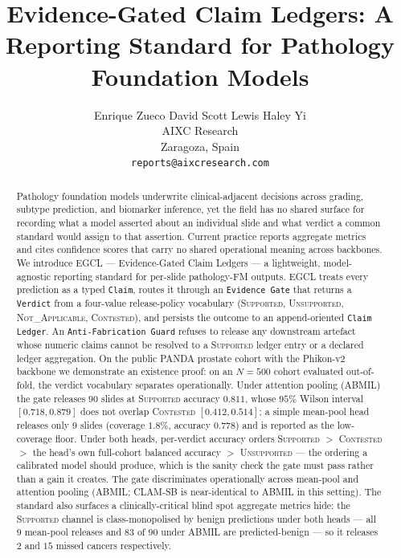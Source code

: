 \documentclass{article}
\title{Evidence-Gated Claim Ledgers: A Reporting Standard for Pathology Foundation Models}
\author{%
  Enrique Zueco \quad David Scott Lewis \quad Haley Yi \\
  AIXC Research \\
  Zaragoza, Spain \\
  \texttt{reports@aixcresearch.com}
}
\newcommand{\SafeNum}[1]{#1}
\newcommand{\AggNum}[2]{#2}
\begin{document}
\maketitle

\begin{abstract}
Pathology foundation models underwrite clinical-adjacent decisions across grading, subtype prediction, and biomarker inference, yet the field has no shared surface for recording what a model asserted about an individual slide and what verdict a common standard would assign to that assertion. Current practice reports aggregate metrics and cites confidence scores that carry no shared operational meaning across backbones. We introduce EGCL --- Evidence-Gated Claim Ledgers --- a lightweight, model-agnostic reporting standard for per-slide pathology-FM outputs. EGCL treats every prediction as a typed \texttt{Claim}, routes it through an \texttt{Evidence Gate} that returns a \texttt{Verdict} from a four-value release-policy vocabulary (\textsc{Supported}, \textsc{Unsupported}, \textsc{Not\_Applicable}, \textsc{Contested}), and persists the outcome to an append-oriented \texttt{Claim Ledger}. An \texttt{Anti-Fabrication Guard} refuses to release any downstream artefact whose numeric claims cannot be resolved to a \textsc{Supported} ledger entry or a declared ledger aggregation. On the public PANDA prostate cohort with the Phikon-v2 backbone we demonstrate an existence proof: on an $N{=}\SafeNum{500}$ cohort evaluated out-of-fold, the verdict vocabulary separates operationally. Under attention pooling (ABMIL) the gate releases $\AggNum{abmil.supported.n}{90}$ slides at \textsc{Supported} accuracy $\AggNum{abmil.supported.acc}{0.811}$, whose $\SafeNum{95\%}$ Wilson interval $[\AggNum{abmil.supported.wilson.lo}{0.718}, \AggNum{abmil.supported.wilson.hi}{0.879}]$ does not overlap \textsc{Contested} $[\AggNum{abmil.contested.wilson.lo}{0.412}, \AggNum{abmil.contested.wilson.hi}{0.514}]$; a simple mean-pool head releases only $\AggNum{meanpool.supported.n}{9}$ slides (coverage $\AggNum{meanpool.coverage_pct}{1.8}\%$, accuracy $\AggNum{meanpool.supported.acc}{0.778}$) and is reported as the low-coverage floor. Under both heads, per-verdict accuracy orders \textsc{Supported} $>$ \textsc{Contested} $>$ the head's own full-cohort balanced accuracy $>$ \textsc{Unsupported} --- the ordering a calibrated model should produce, which is the sanity check the gate must pass rather than a gain it creates. The gate discriminates operationally across mean-pool and attention pooling (ABMIL; CLAM-SB is near-identical to ABMIL in this setting). The standard also surfaces a clinically-critical blind spot aggregate metrics hide: the \textsc{Supported} channel is class-monopolised by benign predictions under both heads --- all $\AggNum{meanpool.supported.n}{9}$ mean-pool releases and $\AggNum{abmil.supported.grade0.n}{83}$ of $\AggNum{abmil.supported.n}{90}$ under ABMIL are predicted-benign --- so it releases $\SafeNum{2}$ and $\AggNum{abmil.supported.missed_cancer}{15}$ missed cancers respectively.
\end{abstract}
\end{document}
